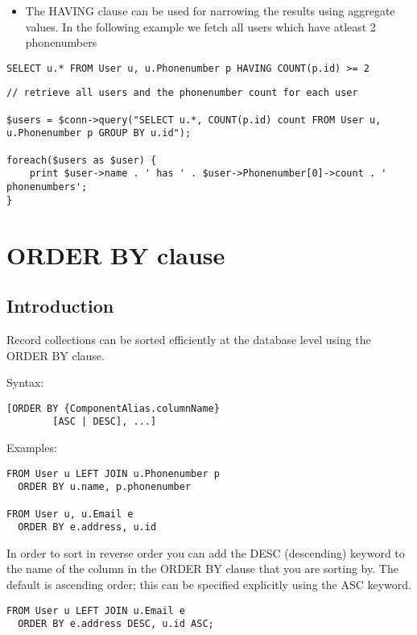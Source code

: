 \documentclass[11pt,a4paper]{report}
\begin{document}
\begin{itemize}
\item{The HAVING clause can be used for narrowing the results using aggregate values. In the following example we fetch all users which have atleast 2 phonenumbers}
\end{itemize}
\begin{verbatim}
SELECT u.* FROM User u, u.Phonenumber p HAVING COUNT(p.id) >= 2
\end{verbatim}

\begin{verbatim}
// retrieve all users and the phonenumber count for each user

$users = $conn->query("SELECT u.*, COUNT(p.id) count FROM User u, u.Phonenumber p GROUP BY u.id");

foreach($users as $user) {
    print $user->name . ' has ' . $user->Phonenumber[0]->count . ' phonenumbers';
}
\end{verbatim}

\section{ORDER BY clause}
\subsection{Introduction}
Record collections can be sorted efficiently at the database level using the ORDER BY clause.

Syntax:

\begin{verbatim}
[ORDER BY {ComponentAlias.columnName}
        [ASC | DESC], ...]
\end{verbatim}

Examples:

\begin{verbatim}
FROM User u LEFT JOIN u.Phonenumber p
  ORDER BY u.name, p.phonenumber

FROM User u, u.Email e
  ORDER BY e.address, u.id
\end{verbatim}

In order to sort in reverse order you can add the DESC (descending) keyword to the name of the column in the ORDER BY clause that you are sorting by. The default is ascending order; this can be specified explicitly using the ASC keyword.

\begin{verbatim}
FROM User u LEFT JOIN u.Email e
  ORDER BY e.address DESC, u.id ASC;
\end{verbatim}
\end{document}
